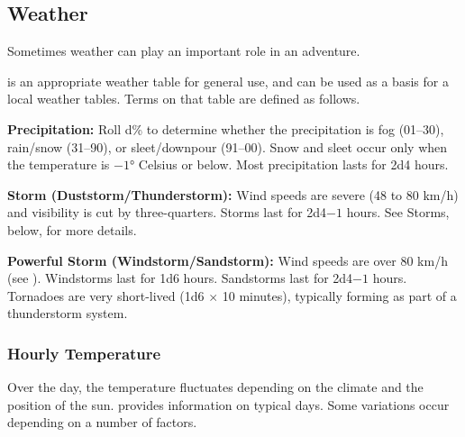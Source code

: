 \subsection{Weather}
Sometimes weather can play an important role in an adventure.

 is an appropriate weather table for general use, and can be used as a basis for a local weather tables. Terms on that table are defined as follows.


\textbf{Precipitation:} Roll d\% to determine whether the precipitation is fog (01--30), rain/snow (31--90), or sleet/downpour (91--00). Snow and sleet occur only when the temperature is $-1$° Celsius or below. Most precipitation lasts for 2d4 hours.

\textbf{Storm (Duststorm/Thunderstorm):} Wind speeds are severe (48 to 80 km/h) and visibility is cut by three-quarters. Storms last for 2d4$-1$ hours. See Storms, below, for more details.

\textbf{Powerful Storm (Windstorm/Sandstorm):} Wind speeds are over 80 km/h (see ). Windstorms last for 1d6 hours. Sandstorms last for 2d4$-1$ hours. Tornadoes are very short-lived (1d6 $\times$ 10 minutes), typically forming as part of a thunderstorm system.

\subsubsection{Hourly Temperature}
Over the day, the temperature fluctuates depending on the climate and the position of the sun.  provides information on typical days. Some variations occur depending on a number of factors.

